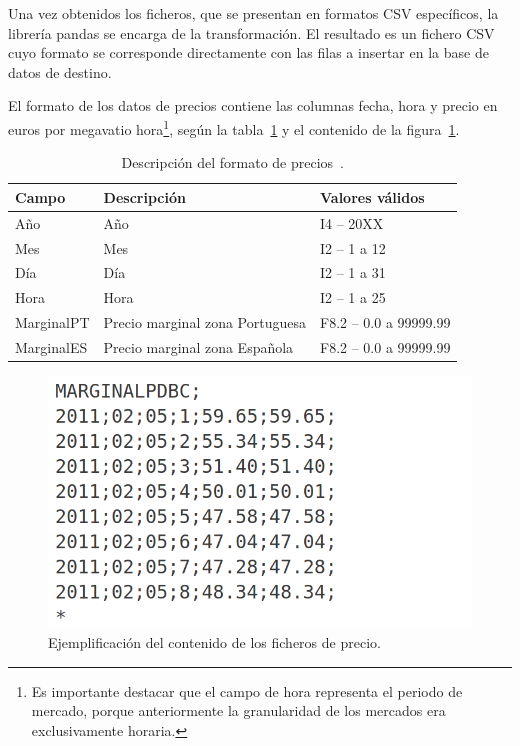Una vez obtenidos los ficheros, que se presentan en formatos CSV específicos, la librería pandas se encarga de la transformación. El resultado es un fichero CSV cuyo formato se corresponde directamente con las filas a insertar en la base de datos de destino.

El formato de los datos de precios contiene las columnas fecha, hora y precio en euros por megavatio hora\footnote{Es importante destacar que el campo de hora representa el periodo de mercado, porque anteriormente la granularidad de los mercados era exclusivamente horaria.}, según la tabla~\ref{tab:descripción-precio} y el contenido de la figura~\ref{fig:contenido-precio}.

\begin{table}[ht]
  \centering
  \begin{tabular}{|l|p{7.5cm}|l|}
    \hline
    Campo      & Descripción                     & Valores válidos        \\
    \hline
    Año        & Año                             & I4 -- 20XX             \\
    Mes        & Mes                             & I2 -- 1 a 12           \\
    Día        & Día                             & I2 -- 1 a 31           \\
    Hora       & Hora                            & I2 -- 1 a 25           \\
    MarginalPT & Precio marginal zona Portuguesa & F8.2 -- 0.0 a 99999.99 \\
    MarginalES & Precio marginal zona Española   & F8.2 -- 0.0 a 99999.99 \\
    \hline
  \end{tabular}
  \caption[Descripción del formato de precios.]{Descripción del formato de precios~\cite{omie2025modelo}.}
  \label{tab:descripción-precio}
\end{table}

\begin{figure}
  \centering
  \includegraphics[width=0.5\linewidth]{figures/contenido-precio.png}
  \caption[Ejemplificación del contenido de los ficheros de precio.]{Ejemplificación del contenido de los ficheros de precio.}
  \label{fig:contenido-precio}
\end{figure}

